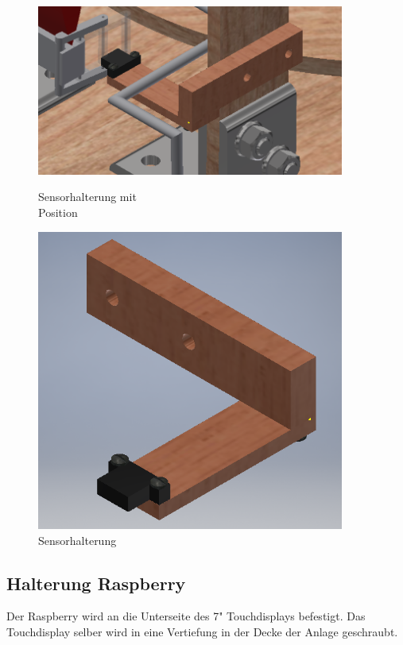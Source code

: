 \begin{figure}[H]
  \begin{minipage}[hbt]{0.45\textwidth}
    \includegraphics[width=0.9\textwidth]{Bilder/Inventor/Sensorhalterung_Klemme}
 	\caption{Sensorhalterung mit \\Position}
  	\label{Sens_halt_mit_gesamt}
  \end{minipage}
\hspace{.03\linewidth}
  \begin{minipage}[hbt]{0.45\textwidth}
    \includegraphics[width=0.9\textwidth]{Bilder/Inventor/Sensorhalterung_Klemme_2}
  	\caption{Sensorhalterung}
  	\label{Sens_halt_allein}
  \end{minipage}
\end{figure}
\subsection{Halterung Raspberry}
Der Raspberry wird an die Unterseite des 7"  Touchdisplays befestigt. Das Touchdisplay selber wird in eine Vertiefung in der Decke der Anlage geschraubt. 
